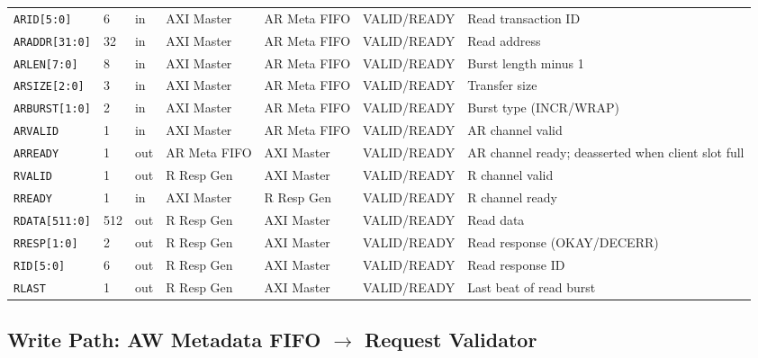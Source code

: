 \documentclass[11pt,a4paper]{article}
\begin{document}
\begin{tabularx}{\textwidth}{L{3.0cm} C{0.8cm} C{1.0cm} L{2.2cm} L{2.2cm} L{2.0cm} X}
\midrule
\texttt{ARID[5:0]}     & 6   & in  & AXI Master & AR Meta FIFO & VALID/READY & Read transaction ID \\
\texttt{ARADDR[31:0]}  & 32  & in  & AXI Master & AR Meta FIFO & VALID/READY & Read address \\
\texttt{ARLEN[7:0]}    & 8   & in  & AXI Master & AR Meta FIFO & VALID/READY & Burst length minus 1 \\
\texttt{ARSIZE[2:0]}   & 3   & in  & AXI Master & AR Meta FIFO & VALID/READY & Transfer size \\
\texttt{ARBURST[1:0]}  & 2   & in  & AXI Master & AR Meta FIFO & VALID/READY & Burst type (INCR/WRAP) \\
\texttt{ARVALID}       & 1   & in  & AXI Master & AR Meta FIFO & VALID/READY & AR channel valid \\
\texttt{ARREADY}       & 1   & out & AR Meta FIFO & AXI Master & VALID/READY & AR channel ready; deasserted when client slot full \\
\midrule
\texttt{RVALID}        & 1   & out & R Resp Gen  & AXI Master  & VALID/READY & R channel valid \\
\texttt{RREADY}        & 1   & in  & AXI Master  & R Resp Gen  & VALID/READY & R channel ready \\
\texttt{RDATA[511:0]}  & 512 & out & R Resp Gen  & AXI Master  & VALID/READY & Read data \\
\texttt{RRESP[1:0]}    & 2   & out & R Resp Gen  & AXI Master  & VALID/READY & Read response (OKAY/DECERR) \\
\texttt{RID[5:0]}      & 6   & out & R Resp Gen  & AXI Master  & VALID/READY & Read response ID \\
\texttt{RLAST}         & 1   & out & R Resp Gen  & AXI Master  & VALID/READY & Last beat of read burst \\
\bottomrule
\end{tabularx}

\subsection{Write Path: AW Metadata FIFO $\rightarrow$ Request Validator}
\end{document}
